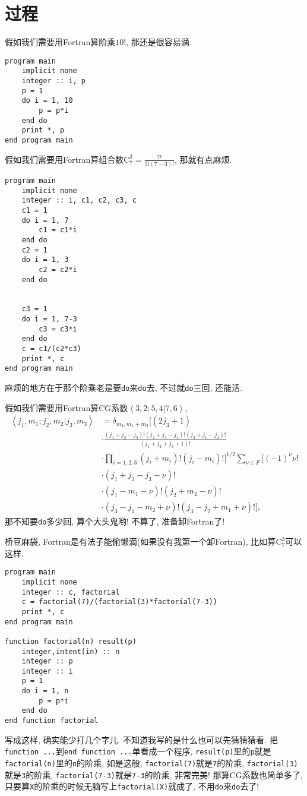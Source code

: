 \chapter{过程}\label{fortran_procedure}

假如我们需要用Fortran算阶乘$10!$, 那还是很容易滴.
\begin{lstlisting}
program main
    implicit none
    integer :: i, p
    p = 1
    do i = 1, 10
        p = p*i
    end do
    print *, p
end program main
\end{lstlisting}

假如我们需要用Fortran算组合数$\text{C}_7^3=\frac{7!}{3!(7-3)!}$, 那就有点麻烦.
\begin{lstlisting}
program main
    implicit none
    integer :: i, c1, c2, c3, c
    c1 = 1
    do i = 1, 7
        c1 = c1*i
    end do
    c2 = 1
    do i = 1, 3
        c2 = c2*i
    end do


    c3 = 1
    do i = 1, 7-3
        c3 = c3*i
    end do
    c = c1/(c2*c3)
    print *, c
end program main
\end{lstlisting}
麻烦的地方在于那个阶乘老是要\texttt{do}来\texttt{do}去, 不过就\texttt{do}三回, 还能活.

假如我们需要用Fortran算CG系数$\left\langle 3,2;5,4|7,6\right\rangle $,
\begin{align*}
    \left\langle j_1,m_1;j_2,m_2|j_3,m_3\right\rangle&=\delta_{m_3,m_1+m_2}\Big[(2j_3+1)\\
    &\cdot\frac{(j_1+j_2-j_3)!(j_2+j_3-j_1)!(j_3+j_1-j_2)!}{(j_1+j_2+j_3+1)!}
    \\
    &\cdot\prod_{i=1,2,3}(j_i+m_i)!(j_i-m_i)!\Big]^{1/2}\sum_{\nu\in F}[(-1)^{\nu}\nu!\\
    &\cdot(j_1+j_2-j_3-\nu)!\\
    &\cdot(j_1-m_1-\nu)!(j_2+m_2-\nu)!\\
    &\cdot(j_3-j_1-m_2+\nu)!(j_3-j_2+m_1+\nu)!],
\end{align*}
那不知要\texttt{do}多少回, 算个大头鬼哟! 不算了, 准备卸Fortran了!

桥豆麻袋, Fortran是有法子能偷懒滴(如果没有我第一个卸Fortran), 比如算$\text{C}_7^3$可以这样.
\begin{lstlisting}
program main
    implicit none
    integer :: c, factorial
    c = factorial(7)/(factorial(3)*factorial(7-3))
    print *, c
end program main

function factorial(n) result(p)
    integer,intent(in) :: n
    integer :: p
    integer :: i 
    p = 1
    do i = 1, n
        p = p*i
    end do
end function factorial
\end{lstlisting}
写成这样, 确实能少打几个字儿. 不知道我写的是什么也可以先猜猜猜看. 把\texttt{function ...}到\texttt{end function ...}单看成一个程序, \texttt{result(p)}里的\texttt{p}就是\texttt{factorial(n)}里的\texttt{n}的阶乘, 如是这般, \texttt{factorial(7)}就是\texttt{7}的阶乘, \texttt{factorial(3)}就是\texttt{3}的阶乘, \texttt{factorial(7-3)}就是\texttt{7-3}的阶乘, 非常完美! 那算CG系数也简单多了, 只要算\texttt{X}的阶乘的时候无脑写上\texttt{factorial(X)}就成了, 不用\texttt{do}来\texttt{do}去了!


